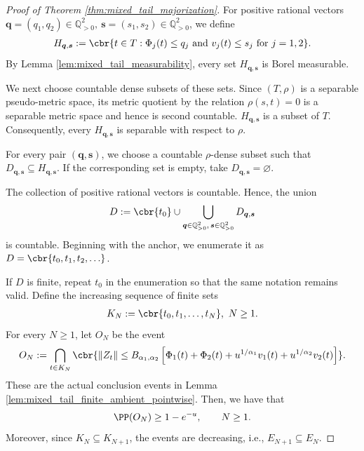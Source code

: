 \documentclass[11pt]{article}
\begin{document}
\begin{proof}[Proof of Theorem
\ref{thm:mixed_tail_majorization}] For positive rational vectors
$\boldsymbol q=(q_1,q_2)\in\mathbb Q_{>0}^2,
\ 
\boldsymbol s=(s_1,s_2)\in\mathbb Q_{>0}^2$,
we define
\begin{align*}
H_{\boldsymbol q,\boldsymbol s}
:=
\cbr{
t\in T:
\Phi_j(t)\le q_j
\text{ and }
v_j(t)\le s_j
\text{ for }j=1,2
}.
\end{align*}
By Lemma \ref{lem:mixed_tail_measurability}, every set
$H_{\boldsymbol q,\boldsymbol s}$ is Borel measurable.

We next choose countable dense subsets of these sets. Since
$(T,\rho)$ is a separable pseudo-metric space, its metric quotient by
the relation $\rho(s,t)=0$ is a separable metric space and hence is
second countable. $H_{\boldsymbol q,\boldsymbol s}$ is a subset of $T$. Consequently, every
$H_{\boldsymbol q,\boldsymbol s}$ is separable with respect to $\rho$.

For every pair
$(\boldsymbol q,\boldsymbol s)$, we choose a countable $\rho$-dense subset such that
$D_{\boldsymbol q,\boldsymbol s}
\subseteq
H_{\boldsymbol q,\boldsymbol s}$. If the corresponding set is empty, take
$D_{\boldsymbol q,\boldsymbol s}=\varnothing$.

The collection of positive rational vectors is countable. Hence, the
union
\begin{align*}
D
:=
\cbr{t_0}\cup
\bigcup_{
\boldsymbol q\in\mathbb Q_{>0}^2,\,
\boldsymbol s\in\mathbb Q_{>0}^2
}
D_{\boldsymbol q,\boldsymbol s}
\end{align*}
is countable. Beginning with the anchor, we enumerate it as $D=\cbr{t_0,t_1,t_2,\ldots}$.

If $D$ is finite, repeat $t_0$ in the enumeration so that the same
notation remains valid. Define the increasing sequence of finite sets
\begin{align*}
K_N:=\cbr{t_0,t_1,\ldots,t_N},
\ N\ge1.
\end{align*}
For every $N\ge1$, let $O_N$ be the event
\begin{align*}
O_N
:=
\bigcap_{t\in K_N}
\cbr{
\|Z_t\|
\le
B_{\alpha_1,\alpha_2}
\left[
\Phi_1(t)+\Phi_2(t)
+
u^{1/\alpha_1}v_1(t)
+
u^{1/\alpha_2}v_2(t)
\right]
}.
\end{align*}
These are the actual conclusion events in
Lemma \ref{lem:mixed_tail_finite_ambient_pointwise}. Then, we have that
\begin{align*}
\PP(O_N)\ge1-e^{-u},
\qquad N\ge1.
\end{align*}
Moreover, since $K_N\subseteq K_{N+1}$, the events are decreasing, i.e., $
E_{N+1}\subseteq E_N$.


\end{proof}
\end{document}
